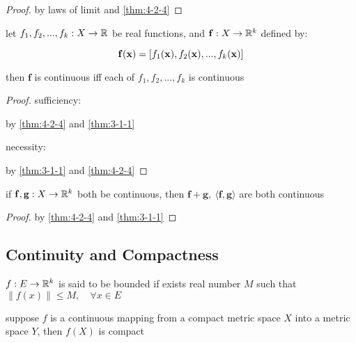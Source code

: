 \begin{proof}
    by laws of limit and \autoref{thm:4-2-4}
\end{proof}

\begin{thm}
    let $f_1,f_2,...,f_k: X \to \mathbb{R}$ be real functions, and $\mathbf{f}: X \to \mathbb{R}^k$ defined by: 

    \[
        \mathbf{f}(\mathbf{x}) = [f_1(\mathbf{x}), f_2(\mathbf{x}),...,f_k(\mathbf{x})]
    \]

    then $\mathbf{f}$ is continuous iff each of $f_1,f_2,...,f_k$  is continuous
\end{thm}

\begin{proof}
    sufficiency:
    
    by \autoref{thm:4-2-4} and \autoref{thm:3-1-1}

    necessity:


    by \autoref{thm:3-1-1} and \autoref{thm:4-2-4}
\end{proof}

\begin{thm}
    if $\mathbf{f}, \mathbf{g}: X \to \mathbb{R}^k$ both be continuous, then $\mathbf{f} +  \mathbf{g}, \: \langle \mathbf{f}, \mathbf{g} \rangle$
    are both continuous
\end{thm}

\begin{proof}
    by \autoref{thm:4-2-4} and \autoref{thm:3-1-1}
\end{proof}

\subsection{Continuity and Compactness}

\begin{definition}
    $f: E \to \mathbb{R}^k$ is said to be bounded if exists real number $M$ such that
    $\| f(x)\| \le M,\quad \forall x \in E$
\end{definition}

\begin{thm}
    \label{thm:compact-image}
    suppose $f$ is a continuous mapping from a compact metric space $X$
    into a metric space $Y$, then $f(X)$ is compact
\end{thm}

